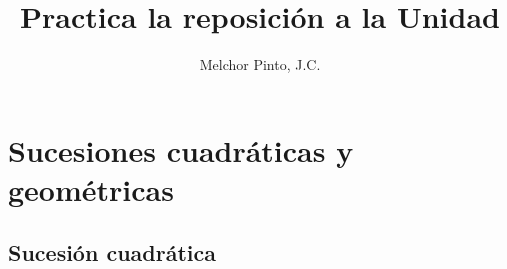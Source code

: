 \documentclass[12pt,addpoints]{repaso}
\title{Practica la reposición a la Unidad}
\author{Melchor Pinto, J.C.}
\begin{document}
\INFO%
\begin{multicols}{2}
	\tableofcontents
\end{multicols}
\vfill
\begin{multicols}{2}
    
    \vspace*{2\baselineskip}
    
    
\end{multicols}
\section{Sucesiones cuadráticas y geométricas}
\subsection{Sucesión cuadrática}
\end{document}
